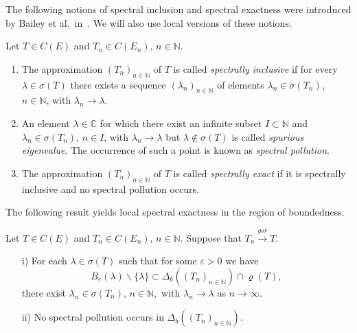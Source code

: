 \documentclass[a4paper,reqno]{amsart}
\begin{document}
{The following notions of spectral inclusion and spectral exactness were introduced by Bailey et al.\ in~\cite{Bailey-1993}. We will also use local versions of these notions.
\begin{definition}\label{defspectralexactness}
Let $T\in C(E)$ and $T_n\in C(E_n)$, $n\in{\mathbb{N}}$. 
\begin{enumerate}[label=\rm{\roman{*})}]
\item The approximation $(T_n)_{n\in{\mathbb{N}}}$ of $T$ is called \emph{spectrally inclusive} if for every $\lambda\in\sigma(T)$ there exists a sequence $(\lambda_n)_{n\in{\mathbb{N}}}$ of elements $\lambda_n\in\sigma(T_n)$, $n\in{\mathbb{N}}$, with $\lambda_n\to\lambda$.
\item An element $\lambda\in{\mathbb{C}}$ for which there exist an infinite subset $I\subset{\mathbb{N}}$ and $\lambda_n\in\sigma(T_n)$, $n\in I$, with $\lambda_n\to\lambda$ but $\lambda\notin\sigma(T)$ is called 
\emph{spurious eigenvalue}. The occurrence of such a point is known as \emph{spectral pollution}.
\item  The approximation $(T_n)_{n\in{\mathbb{N}}}$ of $T$ is called \emph{spectrally exact} if it is spectrally inclusive and no spectral pollution occurs. 
\end{enumerate}
\end{definition}

The following result yields local spectral exactness  in the region of boundedness.
\begin{theorem}\label{thmlocal}
Let $T\in C(E)$ and $T_n\in C(E_n)$, $n\in{\mathbb{N}}$.
Suppose that $T_n{\stackrel{gsr}{\rightarrow}} T$.
\begin{enumerate}
\item[\rm i)] For each $\lambda\in\sigma(T)$ such that for some $\varepsilon>0$ we have 
\begin{equation} B_\varepsilon(\lambda)\backslash\{\lambda\}\subset \Delta_b\left((T_n)_{n\in{\mathbb{N}}}\right)\cap\varrho(T),\label{eqneighbourhoodinregionofbdd}\end{equation}  
there exist $\lambda_n\in\sigma(T_n), \,n\in{\mathbb{N}},$ with $\lambda_n\to\lambda$ as $n\to\infty$.
\item[\rm ii)] No spectral pollution occurs in $\Delta_b\left((T_n)_{n\in{\mathbb{N}}}\right)$.
\end{enumerate}
\end{theorem}

}
\end{document}
